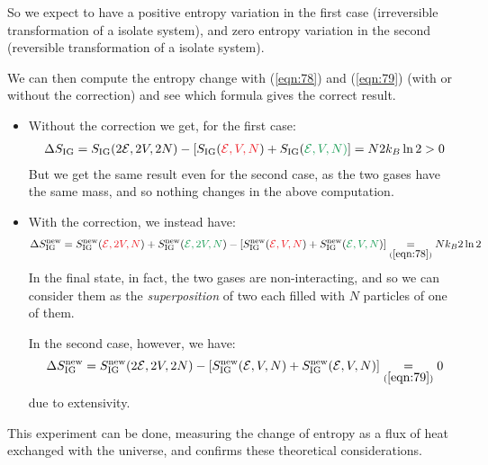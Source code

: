\documentclass[../template.tex]{subfiles}
\begin{document}
\medskip

So we expect to have a positive entropy variation in the first case (irreversible transformation of a isolate system), and zero entropy variation in the second (reversible transformation of a isolate system). 
 
\medskip

We can then compute the entropy change with (\ref{eqn:78}) and (\ref{eqn:79}) (with or without the correction) and see which formula gives the correct result. 

\begin{itemize}
    \item Without the correction we get, for the first case:
    \begin{align*}
        \Delta S_{\mathrm{IG}} = S_{\mathrm{IG}}(2 \mathcal{E}, 2V, 2N) - [S_{\mathrm{IG}}(\textcolor{Red}{\mathcal{E}, V, N}) + S_{\mathrm{IG}}(\textcolor{ForestGreen}{\mathcal{E}, V, N)}] = N 2 k_B \ln 2 > 0
    \end{align*}
    But we get the same result even for the second case, as the two gases have the same mass, and so nothing changes in the above computation.
    \item With the correction, we instead have:
    \begin{align*}
        \Delta S_{\mathrm{IG}}^{\mathrm{new}} = S_{\mathrm{IG}}^{\mathrm{new}}(\textcolor{Red}{\mathcal{E}, 2V, N}) + S_{\mathrm{IG}}^{\mathrm{new}}(\textcolor{ForestGreen}{\mathcal{E}, 2V, N}) - [S_{\mathrm{IG}}^{\mathrm{new}}(\textcolor{Red}{\mathcal{E}, V, N}) + S_{\mathrm{IG}}^{\rm{new}}(\textcolor{ForestGreen}{\mathcal{E}, V, N})] \underset{(\ref{eqn:78})}{=}  Nk_B 2 \ln 2
    \end{align*}
    In the final state, in fact, the two gases are non-interacting, and so we can consider them as the \textit{superposition} of two  each filled with $N$ particles of one of them.
    
    \medskip

    In the second case, however, we have:
    \begin{align*}
        \Delta S_{\mathrm{IG}}^{\mathrm{new}} = S_{\mathrm{IG}}^{\mathrm{new}} (2 \mathcal{E}, 2V, 2N) - [S_{\mathrm{IG}}^{\mathrm{new}}(\mathcal{E}, V, N) + S_{\mathrm{IG}}^{\mathrm{new}}(\mathcal{E}, V, N)] \underset{(\ref{eqn:79})}{=}  0
    \end{align*}
    due to extensivity.
\end{itemize}

This experiment can be done, measuring the change of entropy as a flux of heat exchanged with the universe, and confirms these theoretical considerations.
\end{document}
